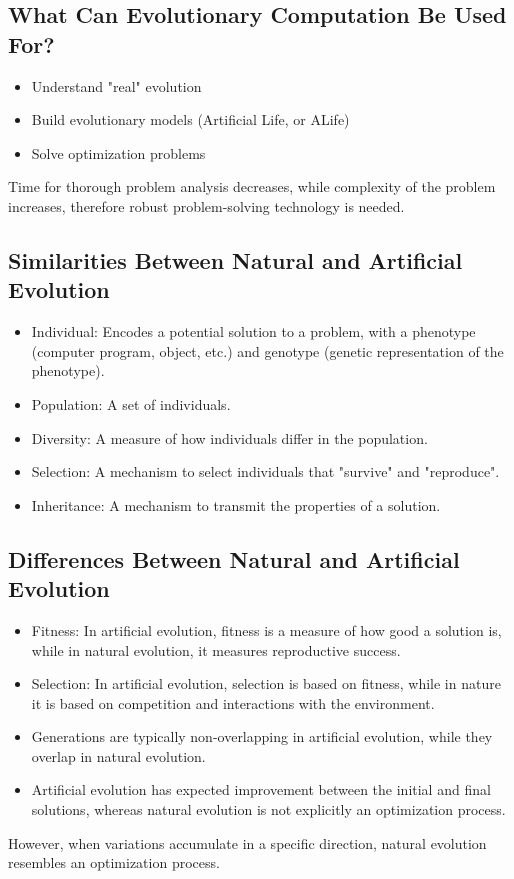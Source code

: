 \subsection*{What Can Evolutionary Computation Be Used For?}
\begin{itemize}
    \item Understand "real" evolution
    \item Build evolutionary models (Artificial Life, or ALife)
    \item Solve optimization problems
\end{itemize}
Time for thorough problem analysis decreases, while complexity of the problem increases, therefore robust problem-solving technology is needed.

\subsection*{Similarities Between Natural and Artificial Evolution}
\begin{itemize}
    \item Individual: Encodes a potential solution to a problem, with a phenotype (computer program, object, etc.) and genotype (genetic representation of the phenotype).
    \item Population: A set of individuals.
    \item Diversity: A measure of how individuals differ in the population.
    \item Selection: A mechanism to select individuals that "survive" and "reproduce".
    \item Inheritance: A mechanism to transmit the properties of a solution.
\end{itemize}

\subsection*{Differences Between Natural and Artificial Evolution}
\begin{itemize}
    \item  Fitness: In artificial evolution, fitness is a measure of how good a solution is, while in natural evolution, it measures reproductive success.
    \item  Selection: In artificial evolution, selection is based on fitness, while in nature it is based on competition and interactions with the environment.
    \item  Generations are typically non-overlapping in artificial evolution, while they overlap in natural evolution.
    \item Artificial evolution has expected improvement between the initial and final solutions, whereas natural evolution is not explicitly an optimization process.
\end{itemize}
However, when variations accumulate in a specific direction, natural evolution resembles an optimization process.

